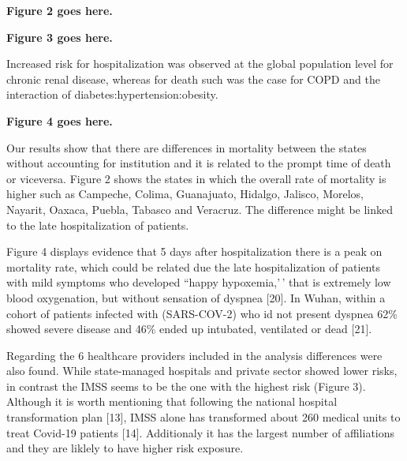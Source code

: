 \documentclass[10pt,letterpaper]{article}
\begin{document}
\vspace{5mm}

\begin{center}
\textbf{Figure 2 goes here.}
\end{center}

\vspace{5mm}

\begin{center}
\textbf{Figure 3 goes here.}
\end{center}

\vspace{5mm}

Increased risk for hospitalization was observed at the global population
level for chronic renal disease, whereas for death such was the case for
COPD and the interaction of diabetes:hypertension:obesity.

\vspace{5mm}

\begin{center}
\textbf{Figure 4 goes here.}
\end{center}

\vspace{5mm}

Our results show that there are differences in mortality between the
states without accounting for institution and it is related to the
prompt time of death or viceversa. Figure 2 shows the states in which
the overall rate of mortality is higher such as Campeche, Colima,
Guanajuato, Hidalgo, Jalisco, Morelos, Nayarit, Oaxaca, Puebla, Tabasco
and Veracruz. The difference might be linked to the late hospitalization
of patients.

Figure 4 displays evidence that 5 days after hospitalization there is a
peak on mortality rate, which could be related due the late
hospitalization of patients with mild symptoms who developed ``happy
hypoxemia,'\,' that is extremely low blood oxygenation, but without
sensation of dyspnea {[}20{]}. In Wuhan, within a cohort of patients
infected with (SARS-COV-2) who id not present dyspnea 62\% showed severe
disease and 46\% ended up intubated, ventilated or dead {[}21{]}.

Regarding the 6 healthcare providers included in the analysis
differences were also found. While state-managed hospitals and private
sector showed lower risks, in contrast the IMSS seems to be the one with
the highest risk (Figure 3). Although it is worth mentioning that
following the national hospital transformation plan {[}13{]}, IMSS alone
has transformed about 260 medical units to treat Covid-19 patients
{[}14{]}. Additionaly it has the largest number of affiliations and they
are liklely to have higher risk exposure.
\end{document}
